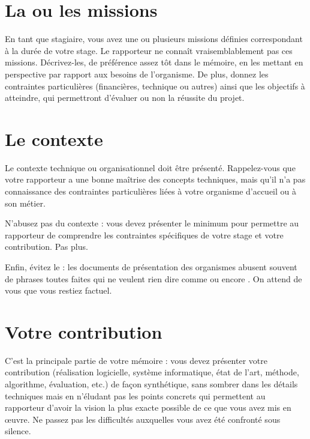 \documentclass [twoside,openright,a4paper,11pt,french] {report}
\begin{document}
\section {La ou les missions}
    \label {sec:mission}

En tant que stagiaire, vous avez une ou plusieurs missions définies
correspondant à la durée de votre stage. Le rapporteur ne connaît
vraisemblablement pas ces missions. Décrivez-les, de préférence assez
tôt dans le mémoire, en les mettant en perspective par rapport aux
besoins de l'organisme. De plus, donnez les contraintes particulières
(financières, technique ou autres) ainsi que les objectifs à atteindre,
qui permettront d'évaluer ou non la réussite du projet.

\section {Le contexte}

Le contexte technique ou organisationnel doit être présenté.
Rappelez-vous que votre rapporteur a une bonne maîtrise des concepts
techniques, mais qu'il n'a pas connaissance des contraintes particulières
liées à votre organisme d'accueil ou à son métier.

N'abusez pas du contexte : vous devez présenter le minimum pour permettre
au rapporteur de comprendre les contraintes spécifiques de votre stage
et votre contribution. Pas plus.

Enfin, évitez le  : les documents de
présentation des organismes abusent souvent de phrases toutes faites qui
ne veulent rien dire comme  ou encore . On attend de vous que vous restiez factuel.


\section {Votre contribution}

C'est la principale partie de votre mémoire : vous devez présenter votre
contribution (réalisation logicielle, système informatique, état de
l'art, méthode, algorithme, évaluation, etc.) de façon synthétique,
sans sombrer dans les détails techniques mais en n'éludant pas les
points concrets qui permettent au rapporteur d'avoir la vision la plus
exacte possible de ce que vous avez mis en œuvre. Ne passez pas
les difficultés auxquelles vous avez été confronté sous silence.
\end{document}
